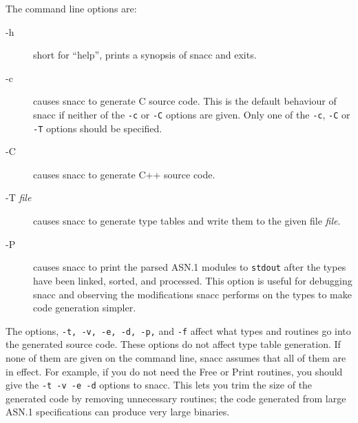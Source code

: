 The command line options are:

\begin{description}
\item[-h    ] {short for ``help'', prints a synopsis of snacc
and exits.}

\item[-c    ] {causes snacc to generate C source code.
This is the default behaviour of snacc if neither of the \verb$-c$ or
\verb$-C$ options are given.  Only one of the \verb$-c$, \verb$-C$ or
\verb$-T$ options should be specified.}

\item[-C    ] {causes snacc to generate C++ source code.}

\item[-T {\em file}] {causes snacc to generate type tables and
write them to the given file {\em file}.}

\item[-P    ] {causes snacc to print the parsed ASN.1
modules to \verb$stdout$ after the types have been linked, sorted, and
processed.  This option is useful for debugging snacc and observing
the modifications snacc performs on the types to make code generation
simpler.}
\end{description}

The options, \verb$-t, -v, -e, -d, -p,$ and \verb$-f$ affect
what types and routines go into the generated source code.
These options do not affect type table generation. If none of
them are given on the command line, snacc assumes that all of them are
in effect.  For example, if you do not need the Free or Print
routines, you should give the \verb$-t -v -e -d$ options to snacc.
This lets you trim the size of the generated code by removing
unnecessary routines; the code generated from large ASN.1
specifications can produce very large binaries.

